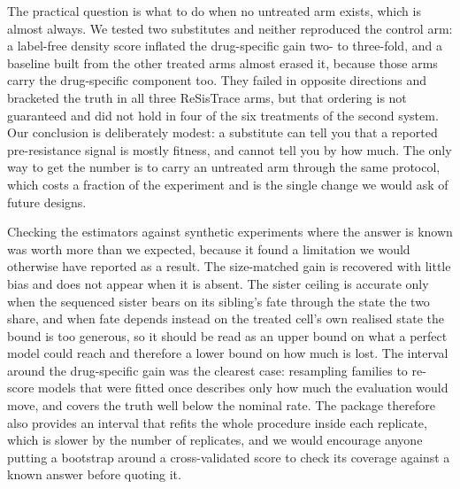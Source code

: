 \documentclass[11pt,a4paper]{article}
\begin{document}
The practical question is what to do when no untreated arm exists, which is almost always. We tested two substitutes and neither reproduced the control arm: a label-free density score inflated the drug-specific gain two- to three-fold, and a baseline built from the other treated arms almost erased it, because those arms carry the drug-specific component too. They failed in opposite directions and bracketed the truth in all three ReSisTrace arms, but that ordering is not guaranteed and did not hold in four of the six treatments of the second system. Our conclusion is deliberately modest: a substitute can tell you that a reported pre-resistance signal is mostly fitness, and cannot tell you by how much. The only way to get the number is to carry an untreated arm through the same protocol, which costs a fraction of the experiment and is the single change we would ask of future designs.

Checking the estimators against synthetic experiments where the answer is known was worth more than we expected, because it found a limitation we would otherwise have reported as a result. The size-matched gain is recovered with little bias and does not appear when it is absent. The sister ceiling is accurate only when the sequenced sister bears on its sibling's fate through the state the two share, and when fate depends instead on the treated cell's own realised state the bound is too generous, so it should be read as an upper bound on what a perfect model could reach and therefore a lower bound on how much is lost. The interval around the drug-specific gain was the clearest case: resampling families to re-score models that were fitted once describes only how much the evaluation would move, and covers the truth well below the nominal rate. The package therefore also provides an interval that refits the whole procedure inside each replicate, which is slower by the number of replicates, and we would encourage anyone putting a bootstrap around a cross-validated score to check its coverage against a known answer before quoting it.
\end{document}
